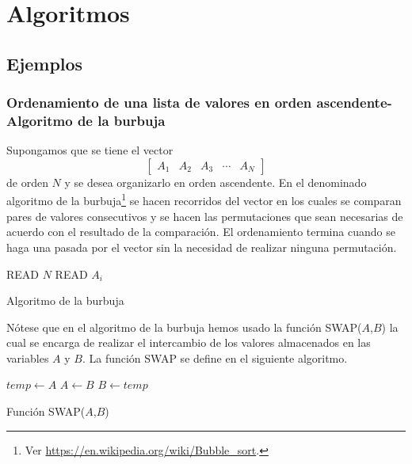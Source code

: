 \graphicspath{{img/algor/}}
\chapter{Algoritmos}

\section{Ejemplos}
\subsection{Ordenamiento de una lista de valores en orden ascendente-Algoritmo de la burbuja}
Supongamos que se tiene el vector
\[\begin{bmatrix}
  A_1 &A_2 &A_3 & \cdots &A_N
\end{bmatrix}\]
de orden $N$ y se desea organizarlo en orden ascendente. En el denominado algoritmo de la burbuja\footnote{Ver \url{https://en.wikipedia.org/wiki/Bubble_sort}.} se hacen recorridos del vector en los cuales se comparan pares de valores consecutivos y se hacen las permutaciones que sean necesarias de acuerdo con el resultado de la comparación. El ordenamiento termina cuando se haga una pasada por el vector sin la necesidad de realizar ninguna permutación.

\begin{algorithm}[H]
\SetAlgoLined
{}
READ $N$\;
READ $A_i$\;
\caption{Algoritmo de la burbuja}
\label{bubble}
\end{algorithm}

Nótese que en el algoritmo de la burbuja hemos usado la función SWAP($A$,$B$) la cual se encarga de realizar el intercambio de los valores almacenados en las variables $A$ y $B$. La función SWAP se define en el siguiente algoritmo.

\begin{algorithm}[H]
  \SetAlgoLined
  $temp \leftarrow A$\;
  $A \leftarrow B$\;
  $B \leftarrow temp$\;
\caption{Función SWAP($A$,$B$)}
\label{swap}
\end{algorithm}

